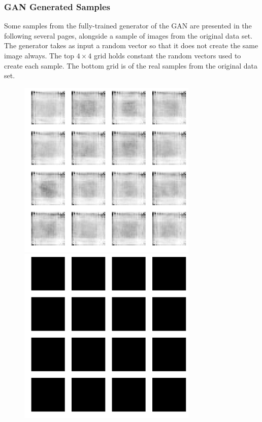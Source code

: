 \documentclass{article}
\begin{document}
\subsubsection{GAN Generated Samples}

Some samples from the fully-trained generator of the GAN are presented in the following several pages, alongside a sample of images from the original data set.
The generator takes as input a random vector so that it does not create the same image always.
The top $4 \times 4$ grid holds constant the random vectors used to create each sample.
The bottom grid is of the real samples from the original data set.


\clearpage
{}
\thispagestyle{empty}
\begin{figure}[ht]
\label{fig:gan-samples-solidcolor}
\centering
\includegraphics[height=323px]{gan-sample-fake-solidcolor.png}
\caption{}
\vspace{1em}
\includegraphics[height=323px]{gan-sample-real-solidcolor.png}
\end{figure}
\end{document}
